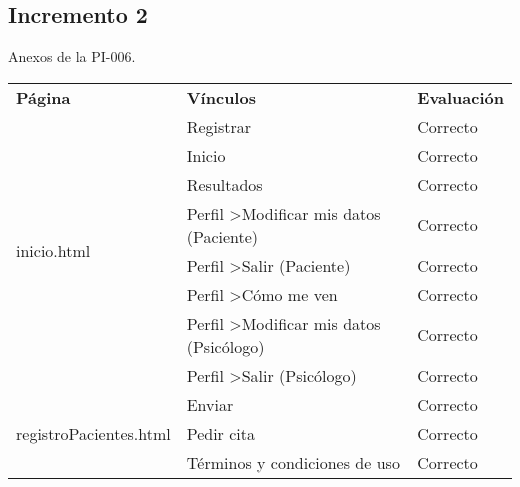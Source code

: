 \subsection{Incremento 2}

Anexos de la PI-006.

\begin{table}[htpb]
\centering
\begin{tabularx}{\textwidth}{|l|X|l|}
\hline
\rowcolor[gray]{0.9}\multicolumn{3}{|l|}{\textbf{Anexo PI-006}}                                                                            \\ \hline
\textbf{Página}                           & \textbf{Vínculos}                                   & \textbf{Evaluación} \\ \hline
\multirow{8}{*}{inicio.html}              & Registrar                                           & Correcto            \\ \cline{2-3} 
                                          & Inicio                                              & Correcto            \\ \cline{2-3} 
                                          & Resultados                                          & Correcto            \\ \cline{2-3} 
                                          & Perfil \textgreater Modificar mis datos (Paciente)  & Correcto            \\ \cline{2-3} 
                                          & Perfil \textgreater Salir (Paciente)                & Correcto            \\ \cline{2-3} 
                                          & Perfil \textgreater Cómo me ven                     & Correcto            \\ \cline{2-3} 
                                          & Perfil \textgreater Modificar mis datos (Psicólogo) & Correcto            \\ \cline{2-3} 
                                          & Perfil \textgreater Salir (Psicólogo)               & Correcto            \\ \hline
\multirow{3}{*}{registroPacientes.html}   & Enviar                                              & Correcto            \\ \cline{2-3} 
                                          & Pedir cita                                          & Correcto            \\ \cline{2-3} 
                                          & Términos y condiciones de uso                       & Correcto            \\ \hline

\end{tabularx}
\end{table}
